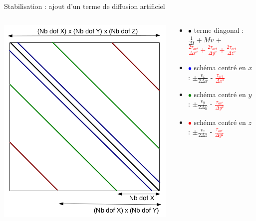 \begin{frame}{Stabilisation : ajout d'un terme de diffusion artificiel}
  \vspace*{-0.3cm}
  \begin{columns}[c]
    \begin{column}{4.5cm}
      \centering
      \includegraphics[scale=0.26]{Figures/FD_matrix.png}
    \end{column}
    \begin{column}{7.5cm}
      \begin{itemize}[label=$\rightarrow$]
      \item \textcolor{black}{$\bullet$} terme diagonal : $\frac{1}{\Delta t} + Mv$ 
        + \textcolor{red}{$\frac{2\tau_{art}}{\Delta x^2} + \frac{2\tau_{art}}{\Delta y^2} + \frac{2\tau_{art}}{\Delta z^2}$}
      \item \textcolor{blue}{$\bullet$} schéma centré en $x$ : $\pm \frac{v_x}{2\Delta x}$
        - \textcolor{red}{$\frac{\tau_{art}}{\Delta x^2}$}
      \item \textcolor{green}{$\bullet$} schéma centré en $y$ : $\pm \frac{v_y}{2\Delta y}$
        - \textcolor{red}{$\frac{\tau_{art}}{\Delta y^2}$}
      \item \textcolor{red}{$\bullet$} schéma centré en $z$ : $\pm \frac{v_z}{2\Delta z}$
        - \textcolor{red}{$\frac{\tau_{art}}{\Delta y^2}$}
      \end{itemize}
    \end{column}
  \end{columns} 

\end{frame}

